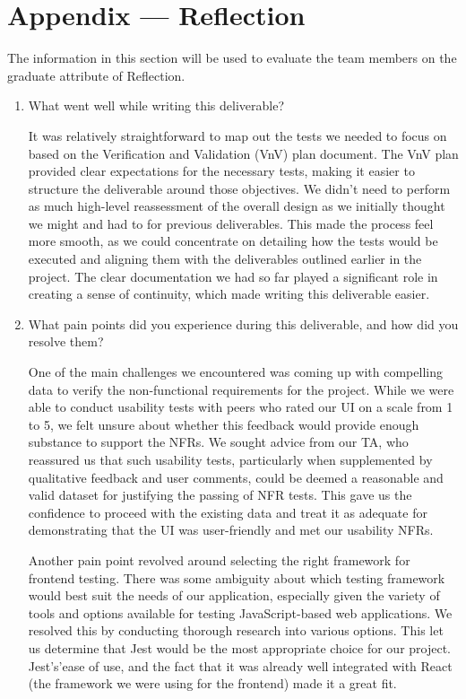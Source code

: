 \documentclass[12pt, titlepage]{article}
\begin{document}
\section*{Appendix --- Reflection}

The information in this section will be used to evaluate the team members on the
graduate attribute of Reflection.



\begin{enumerate}
  \item What went well while writing this deliverable?
  
  It was relatively straightforward to map out the tests we needed to focus on 
  based on the Verification and Validation (VnV) plan document. The VnV plan 
  provided clear expectations for the necessary tests, making it easier to 
  structure the deliverable around those objectives. We didn't need to perform 
  as much high-level reassessment of the overall design as we initially thought 
  we might and had to for previous deliverables. This made the process feel 
  more smooth, as we could concentrate on detailing how the tests would be 
  executed and aligning them with the deliverables outlined earlier in the 
  project. The clear documentation we had so far played a significant role in 
  creating a sense of continuity, which made writing this deliverable easier.

  \item What pain points did you experience during this deliverable, and how
    did you resolve them?

    One of the main challenges we encountered was coming up with compelling 
    data to verify the non-functional requirements for the project. While we 
    were able to conduct usability tests with peers who rated our UI on a scale 
    from 1 to 5, we felt unsure about whether this feedback would provide 
    enough substance to support the NFRs. We sought advice from our TA, who reassured 
    us that such usability tests, particularly when supplemented by qualitative 
    feedback and user comments, could be deemed a reasonable and valid dataset 
    for justifying the passing of NFR tests. This gave us the confidence to proceed 
    with the existing data and treat it as adequate for demonstrating that the UI 
    was user-friendly and met our usability NFRs.

    Another pain point revolved around selecting the right framework for frontend 
    testing. There was some ambiguity about which testing framework 
    would best suit the needs of our application, especially given the variety 
    of tools and options available for testing JavaScript-based web applications. 
    We resolved this by conducting thorough research into various options. This let 
    us determine that Jest would be the most appropriate choice for our project. 
    Jest's'ease of use, and the fact that it was already well integrated with React 
    (the framework we were using for the frontend) made it a great fit.


\end{enumerate}
\end{document}

